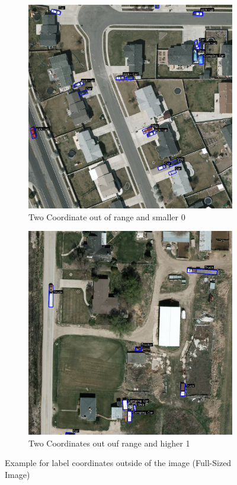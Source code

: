 \begin{figure}[h]
    \centering
    \begin{subfigure}[b]{0.45\textwidth}
        \centering
        \includegraphics[width=\textwidth]{images/bb_smaller0.png}
        \caption{Two Coordinate out of range and smaller 0}
        \label{fig:smaller0_fs}
    \end{subfigure}
    \hfill
    \begin{subfigure}[b]{0.45\textwidth}
        \centering
        \includegraphics[width=\textwidth]{images/bb_higher1.png}
        \caption{Two Coordinates out ouf range and higher 1}
        \label{fig:higher1_fs}
    \end{subfigure}
    \caption{Example for label coordinates outside of the image (Full-Sized Image)}
    \label{fig:example_coords_ooR_fs}
\end{figure}


